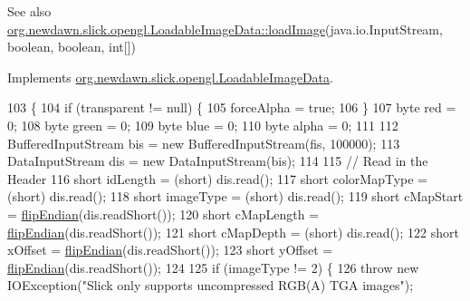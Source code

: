\begin{DoxySeeAlso}{See also}
\mbox{\hyperlink{interfaceorg_1_1newdawn_1_1slick_1_1opengl_1_1_loadable_image_data_a640021b955dde7deeeeabb5ac3738d2b}{org.\+newdawn.\+slick.\+opengl.\+Loadable\+Image\+Data\+::load\+Image}}(java.\+io.\+Input\+Stream, boolean, boolean, int\mbox{[}\mbox{]}) 
\end{DoxySeeAlso}


Implements \mbox{\hyperlink{interfaceorg_1_1newdawn_1_1slick_1_1opengl_1_1_loadable_image_data_ae1be205b86c674550235e9f357adadf5}{org.\+newdawn.\+slick.\+opengl.\+Loadable\+Image\+Data}}.


\begin{DoxyCode}
103                                                                                                            
                       \{
104         \textcolor{keywordflow}{if} (transparent != null) \{ 
105             forceAlpha = \textcolor{keyword}{true};
106         \}
107         byte red = 0;
108         byte green = 0;
109         byte blue = 0;
110         byte alpha = 0;
111         
112         BufferedInputStream bis = \textcolor{keyword}{new} BufferedInputStream(fis, 100000);
113         DataInputStream dis = \textcolor{keyword}{new} DataInputStream(bis);
114         
115         \textcolor{comment}{// Read in the Header}
116         \textcolor{keywordtype}{short} idLength = (short) dis.read();
117         \textcolor{keywordtype}{short} colorMapType = (short) dis.read();
118         \textcolor{keywordtype}{short} imageType = (short) dis.read();
119         \textcolor{keywordtype}{short} cMapStart = \mbox{\hyperlink{classorg_1_1newdawn_1_1slick_1_1opengl_1_1_t_g_a_image_data_a17a25f35cb763e4698de412c2ef34493}{flipEndian}}(dis.readShort());
120         \textcolor{keywordtype}{short} cMapLength = \mbox{\hyperlink{classorg_1_1newdawn_1_1slick_1_1opengl_1_1_t_g_a_image_data_a17a25f35cb763e4698de412c2ef34493}{flipEndian}}(dis.readShort());
121         \textcolor{keywordtype}{short} cMapDepth = (short) dis.read();
122         \textcolor{keywordtype}{short} xOffset = \mbox{\hyperlink{classorg_1_1newdawn_1_1slick_1_1opengl_1_1_t_g_a_image_data_a17a25f35cb763e4698de412c2ef34493}{flipEndian}}(dis.readShort());
123         \textcolor{keywordtype}{short} yOffset = \mbox{\hyperlink{classorg_1_1newdawn_1_1slick_1_1opengl_1_1_t_g_a_image_data_a17a25f35cb763e4698de412c2ef34493}{flipEndian}}(dis.readShort());
124         
125         \textcolor{keywordflow}{if} (imageType != 2) \{
126             \textcolor{keywordflow}{throw} \textcolor{keyword}{new} IOException(\textcolor{stringliteral}{"Slick only supports uncompressed RGB(A) TGA images"});

\end{DoxyCode}
